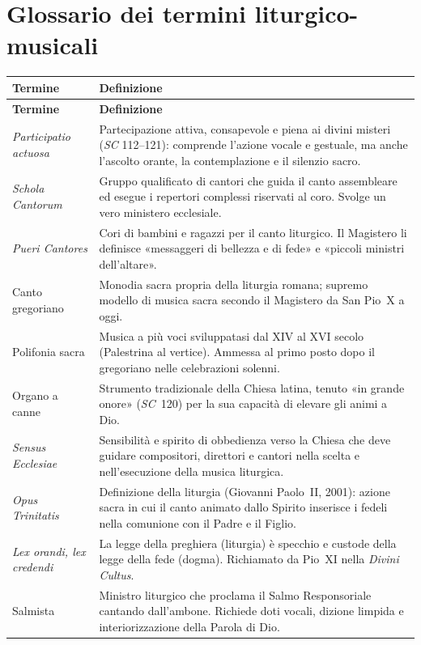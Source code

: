 \documentclass[12pt,a4paper]{article}
\begin{document}
	\section{Glossario dei termini liturgico-musicali}
	
	\begin{longtable}{L{3.5cm}L{11.2cm}}
		\toprule
		\textbf{Termine} & \textbf{Definizione} \\
		\midrule
		\endfirsthead
		\toprule
		\textbf{Termine} & \textbf{Definizione} \\
		\midrule
		\endhead
		\bottomrule
		\endlastfoot
		\emph{Participatio actuosa} &
		Partecipazione attiva, consapevole e piena ai divini misteri (\emph{SC}
		112--121): comprende l'azione vocale e gestuale, ma anche l'ascolto orante,
		la contemplazione e il silenzio sacro. \\
		\emph{Schola Cantorum} &
		Gruppo qualificato di cantori che guida il canto assembleare ed esegue i
		repertori complessi riservati al coro. Svolge un vero ministero ecclesiale. \\
		\emph{Pueri Cantores} &
		Cori di bambini e ragazzi per il canto liturgico. Il Magistero li definisce
		«messaggeri di bellezza e di fede» e «piccoli ministri dell'altare». \\
		Canto gregoriano &
		Monodia sacra propria della liturgia romana; supremo modello di musica sacra
		secondo il Magistero da San Pio~X a oggi. \\
		Polifonia sacra &
		Musica a più voci sviluppatasi dal XIV al XVI secolo (Palestrina al vertice).
		Ammessa al primo posto dopo il gregoriano nelle celebrazioni solenni. \\
		Organo a canne &
		Strumento tradizionale della Chiesa latina, tenuto «in grande onore»
		(\emph{SC}~120) per la sua capacità di elevare gli animi a Dio. \\
		\emph{Sensus Ecclesiae} &
		Sensibilità e spirito di obbedienza verso la Chiesa che deve guidare
		compositori, direttori e cantori nella scelta e nell'esecuzione della musica
		liturgica. \\
		\emph{Opus Trinitatis} &
		Definizione della liturgia (Giovanni Paolo~II, 2001): azione sacra in cui il
		canto animato dallo Spirito inserisce i fedeli nella comunione con il Padre e
		il Figlio. \\
		\emph{Lex orandi, lex credendi} &
		La legge della preghiera (liturgia) è specchio e custode della legge della
		fede (dogma). Richiamato da Pio~XI nella \emph{Divini Cultus}. \\
		Salmista &
		Ministro liturgico che proclama il Salmo Responsoriale cantando dall'ambone.
		Richiede doti vocali, dizione limpida e interiorizzazione della Parola di Dio. \\
	\end{longtable}
	
\end{document}
